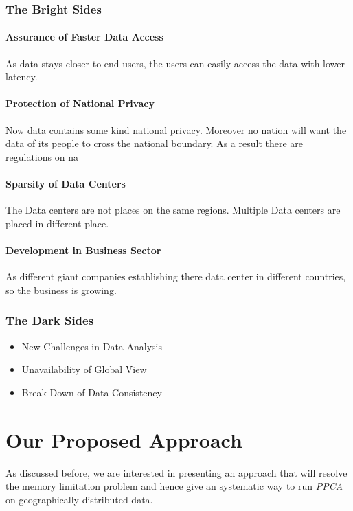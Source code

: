 \documentclass[12pt,notitlepage,oneside]{report}
\begin{document}
\subsection{The Bright Sides}
\subsubsection{Assurance of Faster Data Access}
As data stays closer to end users, the users can easily access the data with lower latency.
\subsubsection{Protection of National Privacy}
Now data contains some kind national privacy. Moreover no nation will want the data of its people to cross the national boundary. As a result there are regulations on na
\subsubsection{Sparsity of Data Centers}
The Data centers are not places on the same regions. Multiple Data centers are placed in different place. 
\subsubsection{Development in Business Sector}
As different giant companies establishing there data center in different countries, so the business is growing.


\subsection{The Dark Sides}
\begin{itemize}
	\item New Challenges in Data Analysis
	\item Unavailability of Global View 
	\item Break Down of Data Consistency
\end{itemize}




\chapter{Our Proposed Approach}
	\label{c:6}
As discussed before, we are interested in presenting an approach that will resolve the memory limitation problem and hence give an systematic way to run \emph{PPCA} on geographically distributed data. 
\end{document}
